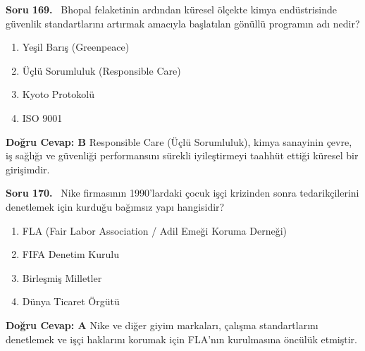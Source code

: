 \documentclass[11pt,a4paper,openany]{book}
\begin{document}
\needspace{5cm}
\vspace{8pt}
\noindent\textbf{\large\sffamily Soru 169.} \ Bhopal felaketinin ardından küresel ölçekte kimya endüstrisinde güvenlik standartlarını artırmak amacıyla başlatılan gönüllü programın adı nedir?
\begin{enumerate}[label=\Alph*), leftmargin=25pt, topsep=4pt, itemsep=2pt]
    \item Yeşil Barış (Greenpeace)
    \item Üçlü Sorumluluk (Responsible Care)
    \item Kyoto Protokolü
    \item ISO 9001
\end{enumerate}
\vspace{4pt}
\begin{tcolorbox}[title=Cevap ve Açıklama, colback=gray!3!white, colframe=primarycolor!90!black, arc=2mm, fonttitle=\bfseries\sffamily, top=6pt, bottom=6pt]
    \textbf{Doğru Cevap: B}
    \vspace{2pt}
    Responsible Care (Üçlü Sorumluluk), kimya sanayinin çevre, iş sağlığı ve güvenliği performansını sürekli iyileştirmeyi taahhüt ettiği küresel bir girişimdir.
\end{tcolorbox}
\vspace{10pt}

\needspace{5cm}
\vspace{8pt}
\noindent\textbf{\large\sffamily Soru 170.} \ Nike firmasının 1990'lardaki çocuk işçi krizinden sonra tedarikçilerini denetlemek için kurduğu bağımsız yapı hangisidir?
\begin{enumerate}[label=\Alph*), leftmargin=25pt, topsep=4pt, itemsep=2pt]
    \item FLA (Fair Labor Association / Adil Emeği Koruma Derneği)
    \item FIFA Denetim Kurulu
    \item Birleşmiş Milletler
    \item Dünya Ticaret Örgütü
\end{enumerate}
\vspace{4pt}
\begin{tcolorbox}[title=Cevap ve Açıklama, colback=gray!3!white, colframe=primarycolor!90!black, arc=2mm, fonttitle=\bfseries\sffamily, top=6pt, bottom=6pt]
    \textbf{Doğru Cevap: A}
    \vspace{2pt}
    Nike ve diğer giyim markaları, çalışma standartlarını denetlemek ve işçi haklarını korumak için FLA'nın kurulmasına öncülük etmiştir.
\end{tcolorbox}
\vspace{10pt}
\end{document}
